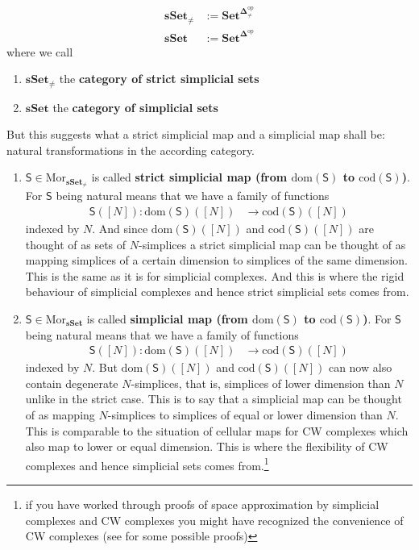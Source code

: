 \begin{align*}
  \mathbf{sSet}_{\neq}
  &:=
  \mathbf{Set}^{\mathbf{\Delta}_{\neq}^{\mathrm{op}}}
  \\
  \mathbf{sSet}
  &:=
  \mathbf{Set}^{\mathbf{\Delta}^{\mathrm{op}}}
\end{align*}
where we call
\begin{enumerate}
\item[(1)]
$\mathbf{sSet}_{\neq}$ the \textbf{category of strict simplicial sets}
\item[(2)]
$\mathbf{sSet}$ the \textbf{category of simplicial sets}
\end{enumerate}
But this suggests what a strict simplicial map and a simplicial map shall be: natural transformations in the according category.
\begin{enumerate}
\item[(1)]
$\mathsf{S} \in \mathrm{Mor}_{\mathbf{sSet}_{\neq}}$ is called \textbf{strict simplicial map (from $\mathrm{dom}(\mathsf{S})$ to $\mathrm{cod}(\mathsf{S})$)}. For $\mathsf{S}$ being natural means that we have a family of functions
\begin{align*}
  \mathsf{S}([N])
  \colon
  \mathrm{dom}(\mathsf{S})([N])
  &\rightarrow
  \mathrm{cod}(\mathsf{S})([N])
\end{align*}
indexed by $N$. And since $\mathrm{dom}(\mathsf{S})([N])$ and $\mathrm{cod}(\mathsf{S})([N])$ are thought of as sets of $N$-simplices a strict simplicial map can be thought of as mapping simplices of a certain dimension to simplices of the same dimension. This is the same as it is for simplicial complexes. And this is where the rigid behaviour of simplicial complexes and hence strict simplicial sets comes from.
\item[(2)]
$\mathsf{S} \in \mathrm{Mor}_{\mathbf{sSet}}$ is called \textbf{simplicial map (from $\mathrm{dom}(\mathsf{S})$ to $\mathrm{cod}(\mathsf{S})$)}. For $\mathsf{S}$ being natural means that we have a family of functions
\begin{align*}
  \mathsf{S}([N])
  \colon
  \mathrm{dom}(\mathsf{S})([N])
  &\rightarrow
  \mathrm{cod}(\mathsf{S})([N])
\end{align*}
indexed by $N$. But $\mathrm{dom}(\mathsf{S})([N])$ and $\mathrm{cod}(\mathsf{S})([N])$ can now also contain degenerate $N$-simplices, that is, simplices of lower dimension than $N$ unlike in the strict case. This is to say that a simplicial map can be thought of as mapping $N$-simplices to simplices of equal or lower dimension than $N$. This is comparable to the situation of cellular maps for CW complexes which also map to lower or equal dimension. This is where the flexibility of CW complexes and hence simplicial sets comes from.\footnote{if you have worked through proofs of space approximation by simplicial complexes and CW complexes you might have recognized the convenience of CW complexes (see \cite{8b5861fc} for some possible proofs)}
\end{enumerate}
